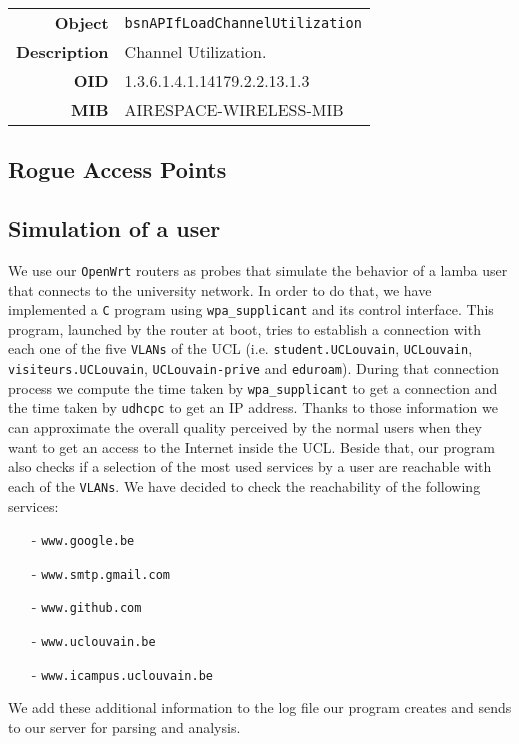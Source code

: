 \begin{tabular}{|r l|}
\hline
\textbf{Object} & \texttt{bsnAPIfLoadChannelUtilization} \\
\textbf{Description} & \parbox{11cm}{Channel Utilization.} \\
\textbf{OID} & 1.3.6.1.4.1.14179.2.2.13.1.3 \\
\textbf{MIB} & AIRESPACE-WIRELESS-MIB \\
\hline
\end{tabular}



\subsection{Rogue Access Points}

\subsection{Simulation of a user}
We use our \texttt{OpenWrt} routers as probes that simulate the behavior of a lamba user that connects to the university network. In order to do that, we have implemented a \texttt{C} program using \texttt{wpa\_supplicant} and its control interface. This program, launched by the router at boot, tries to establish a connection with each one of the five \texttt{VLANs} of the UCL (i.e. \texttt{student.UCLouvain}, \texttt{UCLouvain}, \texttt{visiteurs.UCLouvain}, \texttt{UCLouvain-prive} and \texttt{eduroam}). During that connection process we compute the time taken by \texttt{wpa\_supplicant} to get a connection and the time taken by \texttt{udhcpc} to get an IP address. Thanks to those information we can approximate the overall quality perceived by the normal users when they want to get an access to the Internet inside the UCL. Beside that, our program also checks if a selection of the most used services by a user are reachable with each of the \texttt{VLANs}. We have decided to check the reachability of the following services:
\begin{itemize}
	\item[-] \texttt{www.google.be}
	\item[-] \texttt{www.smtp.gmail.com}
	\item[-] \texttt{www.github.com}
	\item[-] \texttt{www.uclouvain.be}
	\item[-] \texttt{www.icampus.uclouvain.be}
\end{itemize}

We add these additional information to the log file our program creates and sends to our server for parsing and analysis.

